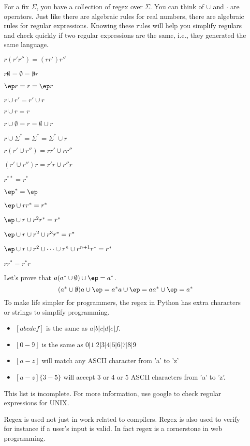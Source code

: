 For a fix $\Sigma$, you have a collection of regex over $\Sigma$.
You can think of $\cup$ and $\cdot$ are operators.
Just like there are algebraic rules for real numbers,
there are algebraic rules for regular expressions.
Knowing these rules will help you simplify regulars and check quickly
if two regular expressions are the same, i.e., they
generated the same language.
\begin{tightlist}
\item $r (r'r'') = (rr')r''$
\item $r \emptyset = \emptyset = \emptyset r$
\item $\ep r = r = \ep r$
\item $r \cup r' = r' \cup r$
\item $r \cup r = r$
\item $r \cup \emptyset = r = \emptyset \cup r$
\item $r \cup \Sigma^* = \Sigma^* = \Sigma^* \cup r$
\item $r (r' \cup r'') = rr' \cup rr''$
\item $(r' \cup r'')r = r'r \cup r''r$
\item $r^{**} = r^*$
\item $\ep^* = \ep$
\item $\ep \cup rr^* = r^*$
\item $\ep \cup r \cup r^2r^* = r^*$
\item $\ep \cup r \cup r^2 \cup r^3r^* = r^*$
\item $\ep \cup r \cup r^2 \cup \cdots \cup r^n \cup r^{n+1}r^* = r^*$
\item $rr^* = r^*r$
\end{tightlist}
\mbox{}

Let's prove that $a(a^* \cup \emptyset) \cup \ep  = a^*$.
\[
(a^* \cup \emptyset)a \cup \ep 
= a^*a \cup \ep = aa^* \cup \ep = a^*
\]
To make life simpler for programmers, the regex in Python has
extra characters or strings to simplify programming.
\begin{itemize}
 \item $[abcdef]$ is the same as $a|b|c|d|e|f$.
 \item $[0-9]$ is the same as $0|1|2|3|4|5|6|7|8|9$
 \item $[a-z]$ will match any ASCII character from 'a' to 'z'
 \item $[a-z]\{3-5\}$ will accept 3 or 4 or 5 ASCII characters from 'a' to 'z'.
\end{itemize}
This list is incomplete. For more information, use google to check
regular expressions for UNIX.

Regex is used not just in work related to compilers. Regex is also
used to verify for instance if a user's input is valid. In fact
regex is a cornerstone in web programming.
